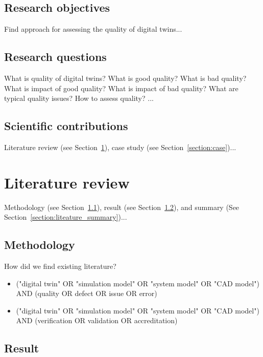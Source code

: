 \documentclass[9pt,conference]{IEEEtran}
\begin{document}
    \subsection{Research objectives}

    Find approach for assessing the quality of digital twins...

    \subsection{Research questions}

    What is quality of digital twins? What is good quality? What is bad quality? What is impact of good quality? What is impact of bad quality? What are typical quality issues? How to assess quality? ...

    \subsection{Scientific contributions}

    Literature review (see Section~\ref{section:literature}), case study (see Section~\ref{section:case})...
    
    \section{Literature review}
    \label{section:literature}

    Methodology (see Section~\ref{section:liteature_methodology}), result (see Section~\ref{section:liteature_result}), and summary (See Section~\ref{section:liteature_summary})...

    \subsection{Methodology}
    \label{section:liteature_methodology}

    How did we find existing literature?
    
    \begin{itemize}
        \item ("digital twin" OR "simulation model" OR "system model" OR "CAD model") AND (quality OR defect OR issue OR error)
        \item ("digital twin" OR "simulation model" OR "system model" OR "CAD model") AND (verification OR validation OR accreditation)
    \end{itemize}

    \subsection{Result}
    \label{section:liteature_result}
\end{document}

